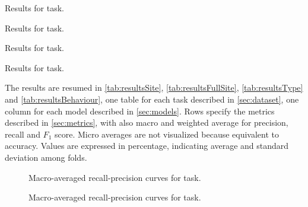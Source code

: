 \begin{table}
  \centering
  \footnotesize
  
  \caption{Results for \site{} task.}
  \label{tab:resultsSite}
\end{table}

\begin{table}
  \centering
  \footnotesize
  
  \caption{Results for \fullSite{} task.}
  \label{tab:resultsFullSite}
\end{table}

\begin{table}
  \centering
  \footnotesize
  
  \caption{Results for \type{} task.}
  \label{tab:resultsType}
\end{table}

\begin{table}
  \centering
  \footnotesize
  
  \caption{Results for \behaviour{} task.}
  \label{tab:resultsBehaviour}
\end{table}

The results are resumed in \cref{tab:resultsSite}, \cref{tab:resultsFullSite},
\cref{tab:resultsType}
and \cref{tab:resultsBehaviour}, one table for each task described
in \cref{sec:dataset}, one column for each 
model described in \cref{sec:models}. Rows specify the metrics
described in \cref{sec:metrics}, with also macro and weighted average
for precision, recall and $F_1$ score. Micro averages are not
visualized because equivalent to accuracy. Values are expressed in
percentage, indicating average and standard deviation among folds.

\begin{figure}
  \centering
  \resizebox{0.9\textwidth}{!}{}
  \caption{Macro-averaged recall-precision curves for \site{} task.}
  \label{fig:curvesSite}
\end{figure}

\begin{figure}
  \centering
  \resizebox{0.9\textwidth}{!}{}
  \caption{Macro-averaged recall-precision curves for \fullSite{} task.}
  \label{fig:curvesFullSite}
\end{figure}


